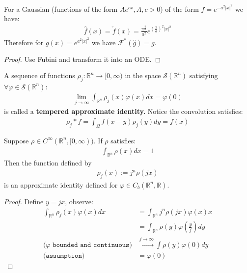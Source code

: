 \begin{proposition}
	For a Gaussian (functions of the form $Ae^{cx}, A, c > 0$) of the form $f = e^{-a^2|x|^2}$ we have:
	\begin{align*}
		\hat{f}(x) = \check{f}(x) =  \frac{\pi^{\frac{2}{n}}}{a^2} e^{(\frac{\pi}{a})^2 |x|^2}
	\end{align*}
	Therefore for $g(x) = e^{a^2 |x|^2}$ we have $\mathcal{F}^*(\hat{g}) = g$. 
\end{proposition}
\begin{proof}
Use Fubini and transform it into an ODE. 
\end{proof}

\begin{definition}
	A sequence of functions $\rho_j: \mathbb{R}^n \rightarrow [0, \infty)$ in the space $\mathcal{S}(\mathbb{R}^n)$ satisfying $\forall \varphi \in \mathcal{S}(\mathbb{R}^n)$:
	\begin{align*}
		\lim_{j \rightarrow \infty}\int_{\mathbb{R}^n} \rho_j(x) \varphi(x)dx = \varphi(0)
	\end{align*}
	is called a \textbf{tempered approximate identity. }Notice the convolution satisfies:
	\begin{align*}
		\rho_j * f = \int_\Omega f(x - y)\rho_j(y) dy = f(x)
	\end{align*}
\end{definition}

\begin{lemma}
	Suppose $\rho \in C^\infty(\mathbb{R}^n, [0, \infty))$. If $\rho$ satisfies:
	\begin{align*}
		\int_{\mathbb{R}^n} \rho(x) dx = 1
	\end{align*}
	Then the function defined by
	\begin{align*}
		\rho_j(x) := j^n \rho(jx)
	\end{align*}
	is an approximate identity defined for $\varphi \in C_b(\mathbb{R}^n, \mathbb{R})$. 
\end{lemma}
\begin{proof}
	Define $y = jx$, observe:
	\begin{align*}
		\int_{\mathbb{R}^n} \rho_j(x) \varphi(x) dx &= \int_{\mathbb{R}^n} j^n \rho(jx) \varphi(x) x\\
		&= \int_{\mathbb{R}^n}\rho(y) \varphi(\frac{y}{j})dy\\
		(\texttt{$\varphi$ bounded and continuous)}
		&\overset{j \rightarrow \infty}{\longrightarrow}
		\int \rho(y) \varphi(0) dy \\
		\texttt{(assumption)}
		&= \varphi(0)
	\end{align*}
\end{proof}


